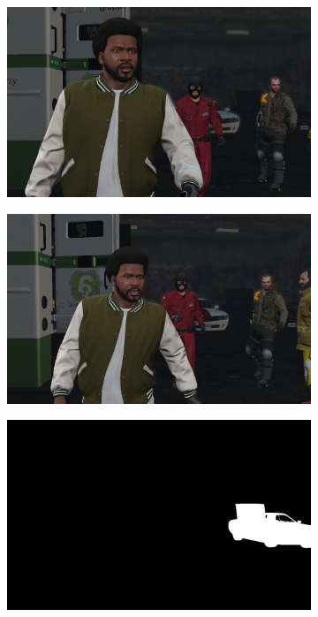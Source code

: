 \begin{figure}
\centering
\begin{subfigure}[t]{0.19\textwidth}
\centering
\includegraphics[scale=0.07]{good_examples/visual_29224_img.png}
\end{subfigure}
\begin{subfigure}[t]{0.19\textwidth}
\centering
\includegraphics[scale=0.07]{good_examples/visual_29224_img1.png}
\end{subfigure}
\begin{subfigure}[t]{0.19\textwidth}
\centering
\includegraphics[scale=0.07]{good_examples/visual_29224_gt.png}

\end{subfigure}
\end{figure}
